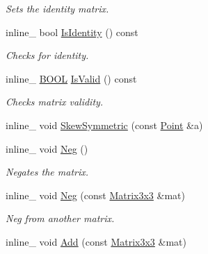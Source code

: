 \begin{DoxyCompactItemize}
\begin{DoxyCompactList}\small\item\em Sets the identity matrix. \end{DoxyCompactList}\item 
inline\+\_\+ bool \hyperlink{classOpcode_1_1Matrix3x3_a7606abd5616b2b19a60355edcda02211}{Is\+Identity} () const \hypertarget{classOpcode_1_1Matrix3x3_a7606abd5616b2b19a60355edcda02211}{}\label{classOpcode_1_1Matrix3x3_a7606abd5616b2b19a60355edcda02211}

\begin{DoxyCompactList}\small\item\em Checks for identity. \end{DoxyCompactList}\item 
inline\+\_\+ \hyperlink{IceTypes_8h_a050c65e107f0c828f856a231f4b4e788}{B\+O\+OL} \hyperlink{classOpcode_1_1Matrix3x3_aceb73b4de3eed16d083affa46c632d34}{Is\+Valid} () const \hypertarget{classOpcode_1_1Matrix3x3_aceb73b4de3eed16d083affa46c632d34}{}\label{classOpcode_1_1Matrix3x3_aceb73b4de3eed16d083affa46c632d34}

\begin{DoxyCompactList}\small\item\em Checks matrix validity. \end{DoxyCompactList}\item 
inline\+\_\+ void \hyperlink{classOpcode_1_1Matrix3x3_a58fda48394586d91d5716f6b13852253}{Skew\+Symmetric} (const \hyperlink{classOpcode_1_1Point}{Point} \&a)
\item 
inline\+\_\+ void \hyperlink{classOpcode_1_1Matrix3x3_ad8968d82cc1ac456bfb3cbb8af050ce5}{Neg} ()\hypertarget{classOpcode_1_1Matrix3x3_ad8968d82cc1ac456bfb3cbb8af050ce5}{}\label{classOpcode_1_1Matrix3x3_ad8968d82cc1ac456bfb3cbb8af050ce5}

\begin{DoxyCompactList}\small\item\em Negates the matrix. \end{DoxyCompactList}\item 
inline\+\_\+ void \hyperlink{classOpcode_1_1Matrix3x3_ac735e9337af200bd0800400583860690}{Neg} (const \hyperlink{classOpcode_1_1Matrix3x3}{Matrix3x3} \&mat)\hypertarget{classOpcode_1_1Matrix3x3_ac735e9337af200bd0800400583860690}{}\label{classOpcode_1_1Matrix3x3_ac735e9337af200bd0800400583860690}

\begin{DoxyCompactList}\small\item\em Neg from another matrix. \end{DoxyCompactList}\item 
inline\+\_\+ void \hyperlink{classOpcode_1_1Matrix3x3_aba98bc50dd23f8fafeb297268bbfe748}{Add} (const \hyperlink{classOpcode_1_1Matrix3x3}{Matrix3x3} \&mat)\hypertarget{classOpcode_1_1Matrix3x3_aba98bc50dd23f8fafeb297268bbfe748}{}\label{classOpcode_1_1Matrix3x3_aba98bc50dd23f8fafeb297268bbfe748}


\end{DoxyCompactItemize}
